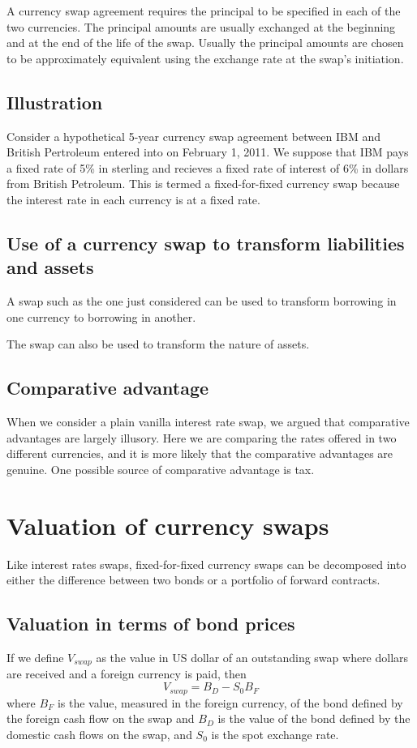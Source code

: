 \documentclass{article}
\begin{document}
A currency swap agreement requires the principal to be specified in each of the two currencies. The principal amounts are usually exchanged at the beginning and at the end of the life of the swap. Usually the principal amounts are chosen to be approximately equivalent using the exchange rate at the swap's initiation. 

\subsection{Illustration}
Consider a hypothetical 5-year currency swap agreement between IBM and British Pertroleum entered into on February 1, 2011. We suppose that IBM pays a fixed rate of 5\% in sterling and recieves a fixed rate of interest of 6\% in dollars from British Petroleum. This is termed a fixed-for-fixed currency swap because the interest rate in each currency is at a fixed rate.

\subsection{Use of a currency swap to transform liabilities and assets}
A swap such as the one just considered can be used to transform borrowing in one currency to borrowing in another.

The swap can also be used to transform the nature of assets.

\subsection{Comparative advantage}
When we consider a plain vanilla interest rate swap, we argued that comparative advantages are largely illusory. Here we are comparing the rates offered in two different currencies, and it is more likely that the comparative advantages are genuine. One possible source of comparative advantage is tax.

\section{Valuation of currency swaps}
Like interest rates swaps, fixed-for-fixed currency swaps can be decomposed into either the difference between two bonds or a portfolio of forward contracts.

\subsection{Valuation in terms of bond prices}
If we define $ V_{swap} $ as the value in US dollar of an outstanding swap where dollars are received and a foreign currency is paid, then
\[
V_{swap}=B_D-S_0B_F
\]
where $ B_F $ is the value, measured in the foreign currency, of the bond defined by the foreign cash flow on the swap and $ B_D $ is the value of the bond defined by the domestic cash flows on the swap, and $ S_0 $ is the spot exchange rate.
\end{document}
